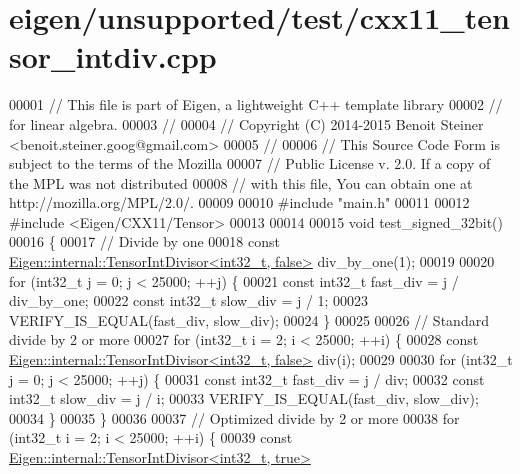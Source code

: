 \hypertarget{eigen_2unsupported_2test_2cxx11__tensor__intdiv_8cpp_source}{}\section{eigen/unsupported/test/cxx11\+\_\+tensor\+\_\+intdiv.cpp}
\label{eigen_2unsupported_2test_2cxx11__tensor__intdiv_8cpp_source}

\begin{DoxyCode}
00001 \textcolor{comment}{// This file is part of Eigen, a lightweight C++ template library}
00002 \textcolor{comment}{// for linear algebra.}
00003 \textcolor{comment}{//}
00004 \textcolor{comment}{// Copyright (C) 2014-2015 Benoit Steiner <benoit.steiner.goog@gmail.com>}
00005 \textcolor{comment}{//}
00006 \textcolor{comment}{// This Source Code Form is subject to the terms of the Mozilla}
00007 \textcolor{comment}{// Public License v. 2.0. If a copy of the MPL was not distributed}
00008 \textcolor{comment}{// with this file, You can obtain one at http://mozilla.org/MPL/2.0/.}
00009 
00010 \textcolor{preprocessor}{#include "main.h"}
00011 
00012 \textcolor{preprocessor}{#include <Eigen/CXX11/Tensor>}
00013 
00014 
00015 \textcolor{keywordtype}{void} test\_signed\_32bit()
00016 \{
00017   \textcolor{comment}{// Divide by one}
00018   \textcolor{keyword}{const} \hyperlink{struct_eigen_1_1internal_1_1_tensor_int_divisor}{Eigen::internal::TensorIntDivisor<int32\_t, false>} 
      div\_by\_one(1);
00019 
00020   \textcolor{keywordflow}{for} (int32\_t j = 0; j < 25000; ++j) \{
00021     \textcolor{keyword}{const} int32\_t fast\_div = j / div\_by\_one;
00022     \textcolor{keyword}{const} int32\_t slow\_div = j / 1;
00023     VERIFY\_IS\_EQUAL(fast\_div, slow\_div);
00024   \}
00025 
00026   \textcolor{comment}{// Standard divide by 2 or more}
00027   \textcolor{keywordflow}{for} (int32\_t i = 2; i < 25000; ++i) \{
00028     \textcolor{keyword}{const} \hyperlink{struct_eigen_1_1internal_1_1_tensor_int_divisor}{Eigen::internal::TensorIntDivisor<int32\_t, false>}
       div(i);
00029 
00030     \textcolor{keywordflow}{for} (int32\_t j = 0; j < 25000; ++j) \{
00031       \textcolor{keyword}{const} int32\_t fast\_div = j / div;
00032       \textcolor{keyword}{const} int32\_t slow\_div = j / i;
00033       VERIFY\_IS\_EQUAL(fast\_div, slow\_div);
00034     \}
00035   \}
00036 
00037   \textcolor{comment}{// Optimized divide by 2 or more}
00038   \textcolor{keywordflow}{for} (int32\_t i = 2; i < 25000; ++i) \{
00039     \textcolor{keyword}{const} \hyperlink{class_eigen_1_1internal_1_1_tensor_int_divisor_3_01int32__t_00_01true_01_4}{Eigen::internal::TensorIntDivisor<int32\_t, true>} 

\end{DoxyCode}
